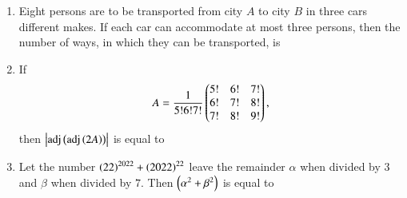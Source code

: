 \documentclass[journal]{IEEEtran}
\numberwithin{equation}{enumi}
\numberwithin{figure}{enumi}
\begin{document}
\begin{enumerate}
    \item 
    Eight persons are to be transported from city $A$ to city $B$ in three cars different makes. If each car can accommodate at most three persons, then the number of ways, in which they can be transported, is

    \hfill{}

    \begin{enumerate}
    \end{enumerate}

    \item 
    If 
    \begin{align*}
        A = \frac{1}{5!6!7!}\begin{pmatrix}5! & 6! & 7!\\6! & 7! & 8!\\7! & 8! & 9!\end{pmatrix},
    \end{align*}
    then $\left\vert\text{adj}\left(\text{adj}\left(2A\right)\right)\right\vert$ is equal to

    \hfill{}

    \begin{enumerate}
    \end{enumerate}

    \item 
    Let the number $\left(22\right)^{2022} + \left(2022\right)^{22}$ leave the remainder $\alpha$ when divided by $3$ and $\beta$ when divided by $7$. Then $\left(\alpha^2 + \beta^2\right)$ is equal to

    \hfill{}

    \begin{enumerate}
    \end{enumerate}


\end{enumerate}
\end{document}
